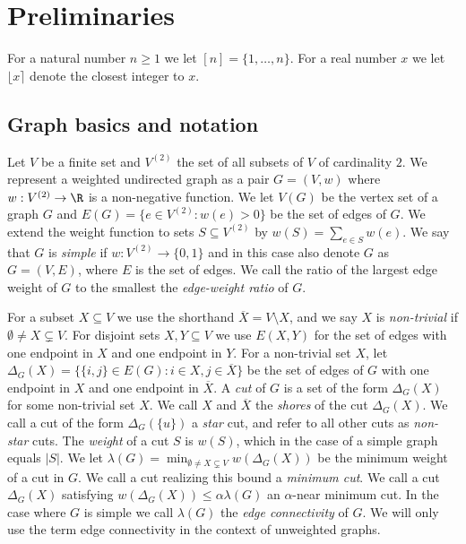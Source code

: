 \setcounter{section}{1}
\section{Preliminaries}
For a natural number $n \ge 1$ we let $[n] = \{1, \ldots, n\}$.  For a real number $x$ we let $\lfloor x \rceil$ denote the closest integer to $x$.

\subsection{Graph basics and notation}
Let $V$ be a finite set and $V^{(2)}$ the set of all subsets of $V$ of cardinality $2$.  We represent a weighted undirected 
graph as a pair $G = (V,w)$ where $w: V^{(2)} \rightarrow \R$ is a non-negative function.  We let $V(G)$ be the vertex set of a graph $G$ and 
$E(G) = \{ e \in V^{(2)}: w(e) > 0\}$ be the set of edges of $G$.  We extend the weight function to sets $S \subseteq V^{(2)}$ by $w(S) = \sum_{e \in S} w(e)$.
We say that $G$ is \emph{simple} if $w: V^{(2)} \rightarrow \{0,1\}$ and in this case also denote $G$ as $G = (V,E)$, where $E$ is the set of edges.  We call the 
ratio of the largest edge weight of $G$ to the smallest the \emph{edge-weight ratio} of $G$.


For a subset $X \subseteq V$ we use the shorthand $\overline{X} = V \setminus X$, and we say $X$ is \emph{non-trivial} if $\emptyset \ne X \subsetneq V$.  
For disjoint sets $X,Y \subseteq V$ we use $E(X,Y)$ for the set of edges with one endpoint in $X$ and one endpoint in $Y$.
For a non-trivial set $X$, let $\Delta_G(X) = \{ \{i,j\} \in E(G) : i \in X, j \in \overline{X}\}$ be the set of edges 
of $G$ with one endpoint in $X$ and one endpoint in $\overline{X}$.  A \emph{cut} of $G$ is a set of the form $\Delta_G(X)$ for some non-trivial 
set $X$.  We call $X$ and $\overline{X}$ the \emph{shores} of the cut $\Delta_G(X)$.  We call a cut of the form $\Delta_G(\{u\})$ a \emph{star} cut, and refer 
to all other cuts as \emph{non-star} cuts.  The \emph{weight} of a cut $S$ is $w(S)$, which in the 
case of a simple graph equals $|S|$.  We let $\lambda(G) = \min_{\emptyset \ne X \subsetneq V} w(\Delta_G(X))$ be the minimum weight of a cut in $G$.  
We call a cut realizing this bound a \emph{minimum cut}.  We call a cut $\Delta_G(X)$ satisfying $w(\Delta_G(X)) \le \alpha \lambda(G)$ an $\alpha$-near minimum cut. 
In the case where $G$ is simple we call $\lambda(G)$ the \emph{edge connectivity} of $G$.  
We will only use the term edge connectivity in the context of unweighted graphs.


